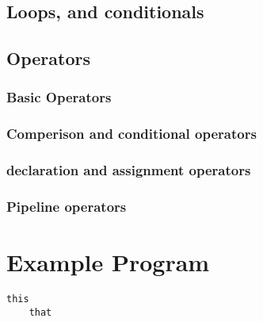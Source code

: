 \documentclass[11pt]{article}
\begin{document}
\subsection{Loops, and conditionals}
\subsection{Operators}
\subsubsection{Basic Operators}
\subsubsection{Comperison and conditional operators}
\subsubsection{declaration and assignment operators}
\subsubsection{Pipeline operators}


\section{Example Program}
\begin{lstlisting}
this
	that
\end{lstlisting}

\end{document}
